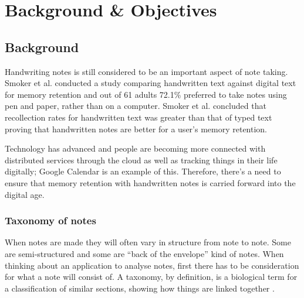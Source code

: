 \chapter{Background \& Objectives}






\section{Background}
Handwriting notes is still considered to be an important aspect of note taking. Smoker et al. \cite{citeulike:13988059} conducted a study comparing handwritten text against digital text for memory retention and out of 61 adults 72.1\% preferred to take notes using pen and paper, rather than on a computer. Smoker et al. concluded that recollection rates for handwritten text was greater than that of typed text proving that handwritten notes are better for a user's memory retention.

Technology has advanced and people are becoming more connected with distributed services through the cloud as well as tracking things in their life digitally; Google Calendar is an example of this. Therefore, there's a need to ensure that memory retention with handwritten notes is carried forward into the digital age.


\subsection{Taxonomy of notes}
When notes are made they will often vary in structure from note to note. Some are semi-structured and some are ``back of the envelope'' kind of notes. When thinking about an application to analyse notes, first there has to be consideration for what a note will consist of. A taxonomy, by definition, is a biological term for a classification of similar sections, showing how things are linked together \cite{citeulike:Taxonomy}.

